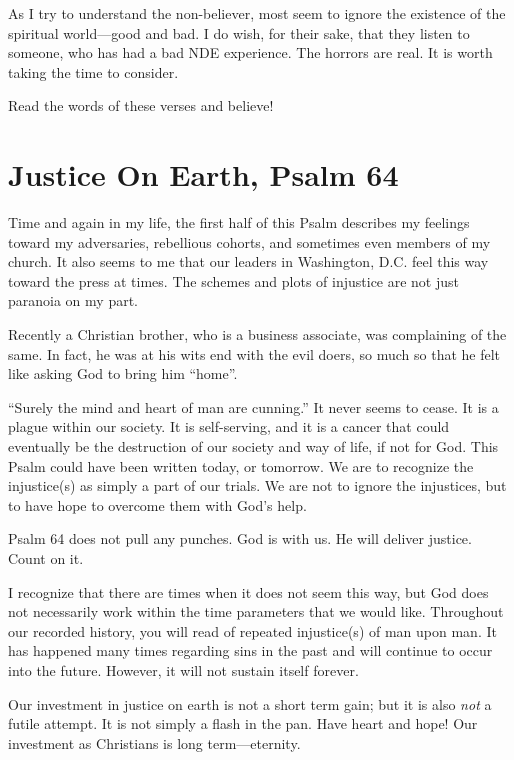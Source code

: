 \documentclass[12pt]{memoir}
\begin{document}
As I try to understand the non-believer, most seem to ignore the existence of the spiritual world---good and bad. I do wish, for their sake, that they listen to someone, who has had a bad NDE experience. The horrors are real. It is worth taking the time to consider.

Read the words of these verses and believe!

\section[Justice On Earth]{Justice On Earth, Psalm 64}

Time and again in my life, the first half of this Psalm describes my feelings toward my adversaries, rebellious cohorts, and sometimes even members of my church. It also seems to me that our leaders in Washington, D.C. feel this way toward the press at times. The schemes and plots of injustice are not just paranoia on my part. 

Recently a Christian brother, who is a business associate, was complaining of the same. In fact, he was at his wits end with the evil doers, so much so that he felt like asking God to bring him ``home''.

``Surely the mind and heart of man are cunning.'' It never seems to cease. It is a plague within our society. It is self-serving, and it is a cancer that could eventually be the destruction of our society and way of life, if not for God. This Psalm could have been written today, or tomorrow. We are to recognize the injustice(s) as simply a part of our trials. We are not to ignore the injustices, but to have hope to overcome them with God's help. 

Psalm 64 does not pull any punches. God is with us. He will deliver
justice. Count on it.

I recognize that there are times when it does not seem this way, but God does not necessarily work within the time parameters that we would like. Throughout our recorded history, you will read of repeated injustice(s) of man upon man. It has happened many times regarding sins in the past and will continue to occur into the future. However, it will not sustain itself forever.

Our investment in justice on earth is not a short term gain; but it is also \emph{not} a futile attempt. It is not simply a flash in the pan. Have heart and hope! Our investment as Christians is long term---eternity. 
\end{document}
